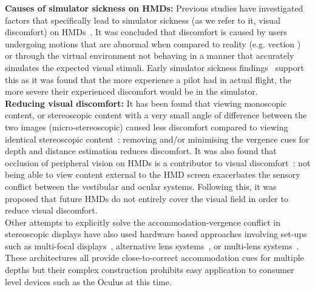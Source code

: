 \noindent \textbf{Causes of simulator sickness on HMDs: }
Previous studies have investigated factors that specifically lead to simulator sickness (as we refer to it, visual discomfort) on HMDs~\cite{kolasinski95, pausch92}. It was concluded that discomfort is caused by users undergoing motions that are abnormal when compared to reality (e.g. vection \cite{hettinger90}) or through the virtual environment not behaving in a manner that accurately simulates the expected visual stimuli. Early simulator sickness findings~\cite{miller58} support this as it was found that the more experience a pilot had in actual flight, the more severe their experienced discomfort would be in the simulator.\\


\noindent \textbf{Reducing visual discomfort: }
It has been found that viewing monoscopic content, or stereoscopic content with a very small angle of difference between the two images (micro-stereoscopic) caused less discomfort compared to viewing identical stereoscopic content~\cite{ehrlich96}: removing and/or minimising the vergence cues for depth and distance estimation reduces discomfort. It was also found that occlusion of peripheral vision on HMDs is a contributor to visual discomfort~\cite{moss11}: not being able to view content external to the HMD screen exacerbates the sensory conflict between the vestibular and ocular systems. Following this, it was proposed that future HMDs do not entirely cover the visual field in order to reduce visual discomfort.\\

Other attempts to explicitly solve the accommodation-vergence conflict in stereoscopic displays have also used hardware based approaches involving set-ups such as multi-focal displays~\cite{akeley04, love09}, alternative lens systems~\cite{liu10}, or multi-lens systems~\cite{rolland05:2, lanman13}. These architectures all provide close-to-correct accommodation cues for multiple depths but their complex construction prohibits easy application to consumer level devices such as the Oculus at this time.\\


